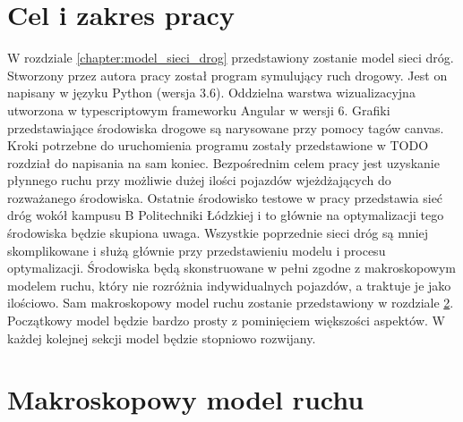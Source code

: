 \documentclass[12pt]{book}
\theoremstyle{plain}
\begin{document}
\chapter{Cel i zakres pracy}
W rozdziale \ref{chapter:model_sieci_drog} przedstawiony zostanie model sieci dróg. Stworzony przez autora pracy został program symulujący ruch drogowy. Jest on napisany w języku Python (wersja 3.6). Oddzielna warstwa wizualizacyjna utworzona w typescriptowym frameworku Angular w wersji 6. Grafiki przedstawiające środowiska drogowe są narysowane przy pomocy tagów canvas. Kroki potrzebne do uruchomienia programu zostały przedstawione w TODO rozdział do napisania na sam koniec.
Bezpośrednim celem pracy jest uzyskanie płynnego ruchu przy możliwie dużej ilości pojazdów wjeżdżających do rozważanego środowiska. Ostatnie środowisko testowe w pracy przedstawia sieć dróg wokół kampusu B Politechniki Łódzkiej i to głównie na optymalizacji tego środowiska będzie skupiona uwaga. Wszystkie poprzednie sieci dróg są mniej skomplikowane i służą głównie przy przedstawieniu modelu i procesu optymalizacji.
Środowiska będą skonstruowane w pełni zgodne z makroskopowym modelem ruchu, który nie rozróżnia indywidualnych pojazdów, a traktuje je jako ilościowo. Sam makroskopowy model ruchu zostanie przedstawiony w rozdziale \ref{chapter:makroskopowy_model_ruchu}. Początkowy model będzie bardzo prosty z pominięciem większości aspektów. W każdej kolejnej sekcji model będzie stopniowo rozwijany.

\chapter{Makroskopowy model ruchu} \label{chapter:makroskopowy_model_ruchu}
\end{document}
